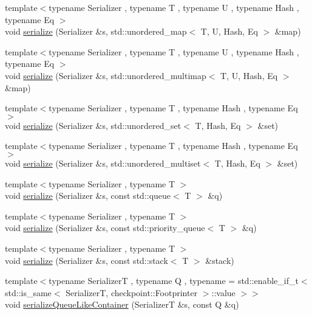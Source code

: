 \begin{DoxyCompactItemize}
{\footnotesize template$<$typename Serializer , typename T , typename U , typename Hash , typename Eq $>$ }\\void \hyperlink{namespacecheckpoint_a9fc2f3eb20d3ce8d6145e99a2559ea58}{serialize} (Serializer \&s, std\+::unordered\+\_\+map$<$ T, U, Hash, Eq $>$ \&map)
\item 
{\footnotesize template$<$typename Serializer , typename T , typename U , typename Hash , typename Eq $>$ }\\void \hyperlink{namespacecheckpoint_aa77eeb7a036d253ef33ed2c9ef764a5e}{serialize} (Serializer \&s, std\+::unordered\+\_\+multimap$<$ T, U, Hash, Eq $>$ \&map)
\item 
{\footnotesize template$<$typename Serializer , typename T , typename Hash , typename Eq $>$ }\\void \hyperlink{namespacecheckpoint_ae4ca8cbc6daf2f5a2a20d44d9fe1cc9f}{serialize} (Serializer \&s, std\+::unordered\+\_\+set$<$ T, Hash, Eq $>$ \&set)
\item 
{\footnotesize template$<$typename Serializer , typename T , typename Hash , typename Eq $>$ }\\void \hyperlink{namespacecheckpoint_a64c8a1aa29d469bc71c88a8836264ecc}{serialize} (Serializer \&s, std\+::unordered\+\_\+multiset$<$ T, Hash, Eq $>$ \&set)
\item 
{\footnotesize template$<$typename Serializer , typename T $>$ }\\void \hyperlink{namespacecheckpoint_a5621e2549443d76acad6c83fdfdcbeab}{serialize} (Serializer \&s, const std\+::queue$<$ T $>$ \&q)
\item 
{\footnotesize template$<$typename Serializer , typename T $>$ }\\void \hyperlink{namespacecheckpoint_a9493433bed418b54358130463961ce50}{serialize} (Serializer \&s, const std\+::priority\+\_\+queue$<$ T $>$ \&q)
\item 
{\footnotesize template$<$typename Serializer , typename T $>$ }\\void \hyperlink{namespacecheckpoint_a1d399ef63dc7723f1b4387e4605b3259}{serialize} (Serializer \&s, const std\+::stack$<$ T $>$ \&stack)
\item 
{\footnotesize template$<$typename SerializerT , typename Q , typename  = std\+::enable\+\_\+if\+\_\+t$<$    std\+::is\+\_\+same$<$      Serializer\+T,      checkpoint\+::\+Footprinter    $>$\+::value  $>$$>$ }\\void \hyperlink{namespacecheckpoint_a33956387419a85cfe810fbce88f5bdf9}{serialize\+Queue\+Like\+Container} (SerializerT \&s, const Q \&q)

\end{DoxyCompactItemize}
